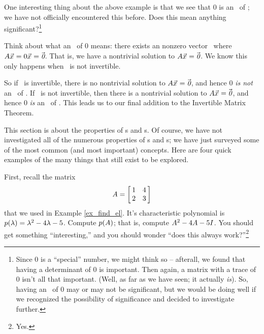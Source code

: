 One interesting thing about the above example is that we see that 0 is an \el\ of \tta; we have not officially encountered this before. Does this mean anything significant?\footnote{Since 0 is a ``special'' number, we might think so -- afterall, we found that having a determinant of 0 is important. Then again, a matrix with a trace of 0 isn't all that important. (Well, as far as we have seen; it actually \textit{is}). So, having an \el\ of 0 may or may not be significant, but we would be doing well if we recognized the possibility of significance and decided to investigate further.} 

Think about what an \el\ of 0 means: there exists an nonzero vector \vx\ where $\tta\vx = 0\vx = \zero$. That is, we have a nontrivial solution to $\tta\vx = \zero$. We know this only happens when \tta\ is not invertible. 

So if \tta\ is invertible, there is no nontrivial solution to $\tta\vx=\zero$, and hence 0 \textit{is not} an \el\ of \tta. If \tta\ is not invertible, then there is a nontrivial solution to $\tta\vx=\zero$, and hence 0 \textit{is} an \el\ of \tta. This leads us to our final addition to the Invertible Matrix Theorem.


This section is about the properties of \el s and \ev s. Of course, we have not investigated all of the numerous properties of \el s and \ev s; we have just surveyed some of the most common (and most important) concepts. Here are four quick examples of the many things that still exist to be explored.

First, recall the matrix $$\tta = \bmx{cc}1&4\\2&3\emx$$ that we used in Example \ref{ex_find_el}. It's characteristic polynomial is $p(\lda)=\lda^2-4\lda-5$. Compute $p(\tta)$; that is, compute $\tta^2-4\tta-5\tti$. You should get something ``interesting,'' and you should wonder ``does this always work?''\footnote{Yes.}

